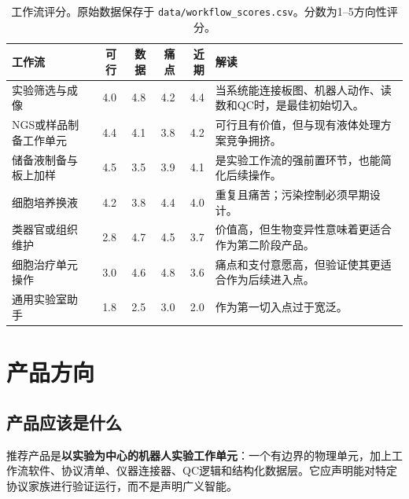 \documentclass[11pt,fontset=none]{ctexart}
\begin{document}
\begin{table}[htbp]
\centering
\scriptsize
\begin{tabularx}{\linewidth}{@{}L{3.15cm}rrrrY@{}}
\toprule
\textbf{工作流} & \textbf{可行} & \textbf{数据} & \textbf{痛点} & \textbf{近期} & \textbf{解读} \\
\midrule
实验筛选与成像 & 4.0 & 4.8 & 4.2 & 4.4 & 当系统能连接板图、机器人动作、读数和QC时，是最佳初始切入。 \\
NGS或样品制备工作单元 & 4.4 & 4.1 & 3.8 & 4.2 & 可行且有价值，但与现有液体处理方案竞争拥挤。 \\
储备液制备与板上加样 & 4.5 & 3.5 & 3.9 & 4.1 & 是实验工作流的强前置环节，也能简化后续操作。 \\
细胞培养换液 & 4.2 & 3.8 & 4.4 & 4.0 & 重复且痛苦；污染控制必须早期设计。 \\
类器官或组织维护 & 2.8 & 4.7 & 4.5 & 3.7 & 价值高，但生物变异性意味着更适合作为第二阶段产品。 \\
细胞治疗单元操作 & 3.0 & 4.6 & 4.8 & 3.6 & 痛点和支付意愿高，但验证使其更适合作为后续进入点。 \\
通用实验室助手 & 1.8 & 2.5 & 3.0 & 2.0 & 作为第一切入点过于宽泛。 \\
\bottomrule
\end{tabularx}
\caption{工作流评分。原始数据保存于 \texttt{data/workflow\_scores.csv}。分数为1--5方向性评分。}
\label{tab:workflow-scores-cn}
\end{table}

\section{产品方向}

\subsection{产品应该是什么}

推荐产品是\textbf{以实验为中心的机器人实验工作单元}：一个有边界的物理单元，加上工作流软件、协议清单、仪器连接器、QC逻辑和结构化数据层。它应声明能对特定协议家族进行验证运行，而不是声明广义智能。
\end{document}
